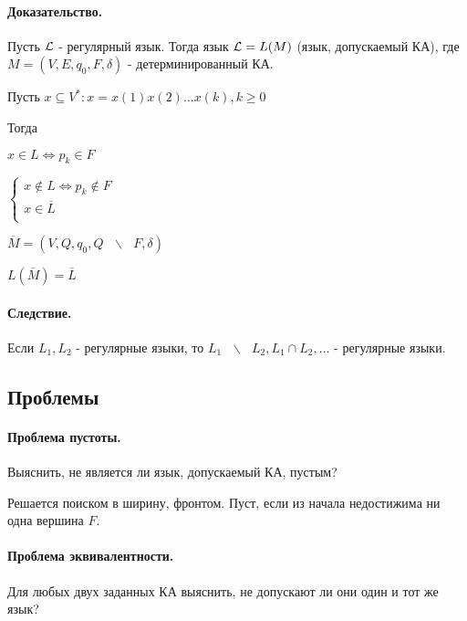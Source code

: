 \documentclass{report}
\newcommand{\bslash}{\mbox{ } \backslash \mbox{ }}
\begin{document}
\paragraph*{Доказательство.}
Пусть $ {\cal L}$ - регулярный язык. Тогда язык $ {\cal L} = L(M)$ (язык, допускаемый КА), где
$M = (V, E, q_0,F,\delta)$ - детерминированный КА.

Пусть $x \subseteq V^{*}: x = x(1)x(2)\ldots x(k), k \ge 0$ 


Тогда

$x \in L \iff p_{k} \in F$ 

$
\begin{cases}
	x \not\in L \iff p_{k} \not\in F\\
	x \in \overline{L} \\
\end{cases}
$ 

\medskip

$\overline{M} = (V, Q, q_0, Q \bslash F, \delta)$ 

$L(\overline{M}) = \overline{L}$

\paragraph*{Следствие.}
Если $L_1, L_2$ - регулярные языки, то $L_1 \bslash L_2, L_1 \cap L_2, \ldots$ - регулярные языки.

\subsection{Проблемы}
\paragraph*{Проблема пустоты.}
Выяснить, не является ли язык, допускаемый КА, пустым?

Решается поиском в ширину, фронтом. Пуст, если из начала недостижима ни одна вершина $F$.

\paragraph*{Проблема эквивалентности.}
Для любых двух заданных КА выяснить, не допускают ли они один и тот же язык?
\end{document}
